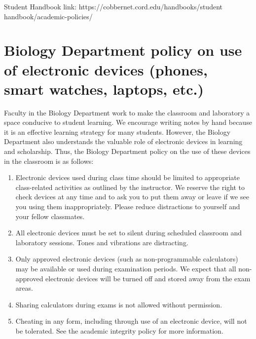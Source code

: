 \documentclass{tufte-handout}
\begin{document}
\begin{fullwidth}

Student Handbook link: https://cobbernet.cord.edu/handbooks/student handbook/academic-policies/




\section{Biology Department policy on use of electronic devices (phones, smart watches, laptops, etc.)}

Faculty in the Biology Department work to make the classroom and laboratory a space conducive to student learning. We encourage writing notes by hand because it is an effective learning strategy for many students. However, the Biology Department also understands the valuable role of electronic devices in learning and scholarship. Thus, the Biology Department policy on the use of these devices in the classroom is as follows:


\begin{enumerate}
\item Electronic devices used during class time should be limited to appropriate class-related activities as outlined by the instructor. We reserve the right to check devices at any time and to ask you to put them away or leave if we see you using them inappropriately. Please reduce distractions to yourself and your fellow classmates.
\item All electronic devices must be set to silent during scheduled classroom and laboratory sessions. Tones and vibrations are distracting.
\item Only approved electronic devices (such as non-programmable calculators) may be available or used during examination periods. We expect that all non-approved electronic devices will be turned off and stored away from the exam areas.
\item Sharing calculators during exams is not allowed without permission. 
\item Cheating in any form, including through use of an electronic device, will not be tolerated. See the academic integrity policy for more information.
\end{enumerate}



\end{fullwidth}
\end{document}
